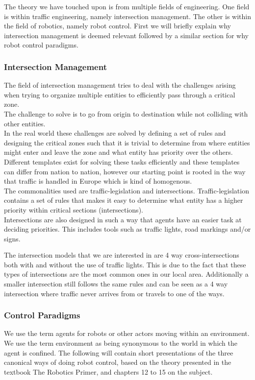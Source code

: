The theory we have touched upon is from multiple fields of engineering. One field is within traffic engineering, namely intersection management. The other is within the field of robotics, namely robot control.
First we will briefly explain why intersection management is deemed relevant followed by a similar section for why robot control paradigms.

\subsubsection{Intersection Management}
The field of intersection management tries to deal with the challenges arising when trying to organize multiple entities to efficiently pass through a critical zone.\\
The challenge to solve is to go from origin to destination while not colliding with other entities.\\

In the real world these challenges are solved by defining a set of rules and designing the critical zones such that it is trivial to determine from where entities might enter and leave the zone and what entity has priority over the others.\\

Different templates exist for solving these tasks efficiently and these templates can differ from nation to nation, however our starting point is rooted in the way that traffic is handled in Europe which is kind of homogenous.\\

The commonalities used are traffic-legislation and intersections.
Traffic-legislation contains a set of rules that makes it easy to determine what entity has a higher priority within critical sections (intersections).\\
Intersections are also designed in such a way that agents have an easier task at deciding priorities. 
This includes tools such as traffic lights, road markings and/or signs.

The intersection models that we are interested in are 4 way cross-intersections both with and without the use of traffic lights.
This is due to the fact that these types of intersections are the most common ones in our local area. Additionally a smaller intersection still follows the same rules and can be seen as a 4 way intersection where traffic never arrives from or travels to one of the ways.

\subsubsection{Control Paradigms}
We use the term agents for robots or other actors moving within an environment.\\
We use the term environment as being synonymous to the world in which the agent is confined.
The following will contain short presentations of the three canonical ways of doing robot control, based on the theory presented in the textbook The Robotics Primer\citep{book:mataric}, and chapters 12 to 15 on the subject.\\

